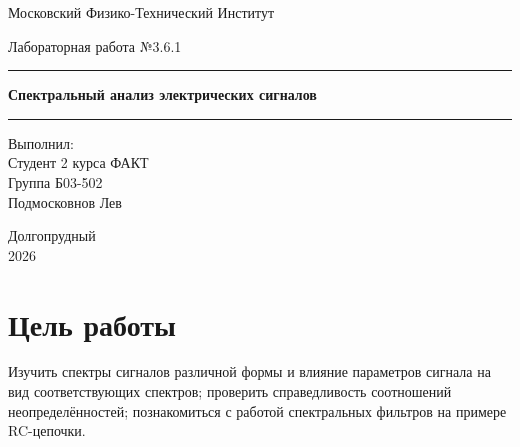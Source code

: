 \documentclass[14pt,a4paper]{extarticle}
\begin{document}

\begin{titlepage}
    \centering

    {\large Московский Физико-Технический Институт\par}

    \vspace{4cm}

    {\large Лабораторная работа №3.6.1\par}

    \vspace{0.5cm}

    \rule{\textwidth}{0.4pt}

    \vspace{0.3cm}

    {\LARGE \textbf{Спектральный анализ электрических сигналов}\par}

    \vspace{0.3cm}

    \rule{\textwidth}{0.4pt}

    \vfill

    \begin{flushright}
        \begin{minipage}{0.42\textwidth}
            Выполнил:\\
            Студент 2 курса ФАКТ\\
            Группа Б03-502\\
            Подмосковнов Лев
        \end{minipage}
    \end{flushright}

    \vfill

    Долгопрудный\\
    2026

\end{titlepage}


\section*{Цель работы}

Изучить спектры сигналов различной формы и влияние параметров сигнала
на вид соответствующих спектров; проверить справедливость соотношений
неопределённостей; познакомиться с работой спектральных фильтров
на примере RC-цепочки.
\end{document}
